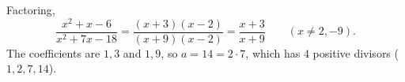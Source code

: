 Factoring,
\[
\dfrac{x^2+x-6}{x^2+7x-18}=\dfrac{(x+3)(x-2)}{(x+9)(x-2)}=\dfrac{x+3}{x+9}\qquad(x\ne2,-9).
\]
The coefficients are $1,3$ and $1,9$, so $a=14=2\cdot7$, which has $\boxed{4}$ positive divisors ($1,2,7,14$).
